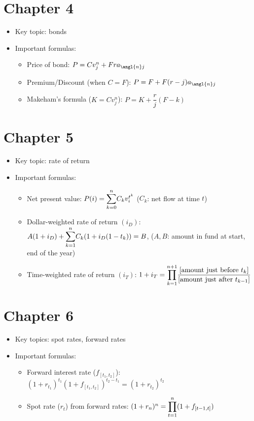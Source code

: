 \documentclass{article}
\begin{document}
\section*{Chapter 4}
\begin{itemize}
	\item Key topic: bonds
	\item Important formulas:
	\begin{itemize}
		\item Price of bond: $P=Cv_j^n+Fra_{\angl{n}j}$
		\item Premium/Discount (when $C=F$): $P=F+F(r-j)a_{\angl{n}j}$
		\item Makeham's formula ($K=Cv_j^n$): $P=K+\dfrac{r}{j}(F-k)$
	\end{itemize}
\end{itemize}

\section*{Chapter 5}
\begin{itemize}
	\item Key topic: rate of return
	\item Important formulas:
	\begin{itemize}
		\item Net present value: $P(i)=\mathlarger{\sum_{k=0}^n}C_kv_i^{t^k}$ ($C_k$: net flow at time $t$)
		\item Dollar-weighted rate of return $(i_D)$: $A(1+i_D)+\mathlarger{\sum_{k=1}^n}C_k(1+i_D(1-t_k))=B$, ($A, B$: amount in fund at start, end of the year)
		\item Time-weighted rate of return $(i_T)$: $1+i_T=\mathlarger{\prod_{k=1}^{n+1}}\dfrac{[\text{amount just before }t_k]}{\text{[amount just after }t_{k-1}]}$
	\end{itemize}
\end{itemize}

\section*{Chapter 6}
\begin{itemize}
	\item Key topics: spot rates, forward rates
	\item Important formulas:
	\begin{itemize}
		\item Forward interest rate ($f_{[t_1,t_2]}$): $(1+r_{t_1})^{t_1}(1+f_{[t_1,t_2]})^{t_2-t_1}=(1+r_{t_2})^{t_2}$
		\item Spot rate ($r_t$) from forward rates: $(1+r_n)^n=\mathlarger{\prod_{t=1}^n}(1+f_{[t-1,t]})$
	\end{itemize}
\end{itemize}
\end{document}
